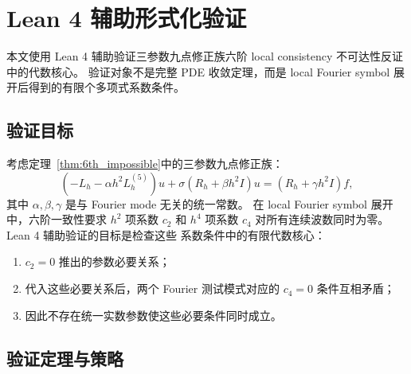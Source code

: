 \section{Lean 4 辅助形式化验证}
\label{app:lean4}

本文使用 Lean 4 辅助验证三参数九点修正族六阶 local consistency 不可达性反证中的代数核心。
验证对象不是完整 PDE 收敛定理，而是 local Fourier symbol 展开后得到的有限个多项式系数条件。

\subsection{验证目标}

考虑定理~\ref{thm:6th_impossible}中的三参数九点修正族：
\begin{equation}
  (-L_h - \alpha h^2 L_h^{(5)})u + \sigma(R_h+\beta h^2 I)u = (R_h+\gamma h^2 I)f,
\end{equation}
其中 $\alpha,\beta,\gamma$ 是与 Fourier mode 无关的统一常数。
在 local Fourier symbol 展开中，六阶一致性要求 $h^2$ 项系数 $c_2$ 和
$h^4$ 项系数 $c_4$ 对所有连续波数同时为零。Lean 4 辅助验证的目标是检查这些
系数条件中的有限代数核心：
\begin{enumerate}[itemsep=1pt]
  \item \(c_2=0\) 推出的参数必要关系；
  \item 代入这些必要关系后，两个 Fourier 测试模式对应的 \(c_4=0\) 条件互相矛盾；
  \item 因此不存在统一实数参数使这些必要条件同时成立。
\end{enumerate}

\subsection{验证定理与策略}

